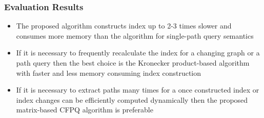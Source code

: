 \documentclass[xcolor=table,aspectratio=169]{beamer}
\begin{document}
\begin{frame}[fragile] \frametitle{Evaluation Results}
	\begin{itemize}
		\item The proposed algorithm constructs index up to 2-3 times slower and consumes more memory than the algorithm for single-path query semantics
		\pause
		\item If it is necessary to frequently recalculate
		the index for a changing graph or a path query then the best
		choice is the Kronecker product-based algorithm with
		faster and less memory consuming index construction
		\pause
		\item If it is  necessary to extract paths many times for a once constructed
		index or index changes can be efficiently computed dynamically then the proposed matrix-based CFPQ algorithm is  preferable
	\end{itemize}
	
	
\end{frame}
\end{document}
